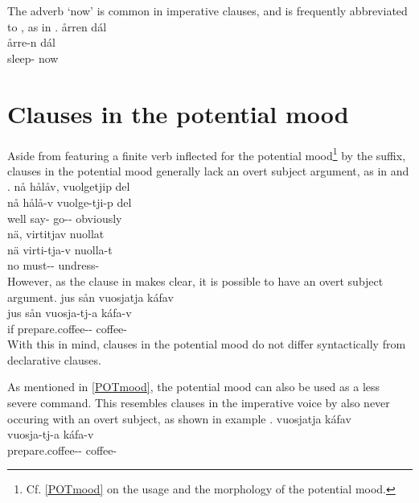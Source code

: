 The adverb  ‘now’ is common in imperative clauses, and is frequently abbreviated to , as in .
\ea\label{impClause5}
\glll	årren dál\\
	årre-n dál\\
	sleep- now\\\nopagebreak
{} 
\z


\section{Clauses in the potential mood}\label{potClauses}
Aside from featuring a finite verb inflected for the potential mood\footnote{Cf. \SEC\ref{POTmood} on the usage and the morphology of the potential mood.} by the  suffix, clauses in the potential mood generally lack an overt subject argument, as in %
 and . 
\ea\label{potSyntaxEx2}
\glll	nå hålåv, vuolgetjip del\\
	nå hålå-v vuolge-tji-p del\\
	well say- go-- obviously\\\nopagebreak
{}	
\z
\ea\label{potSyntaxEx3}
\glll	nä, virtitjav nuollat\\
	nä virti-tja-v nuolla-t\\
	no must-- undress-\\\nopagebreak
{}	
\z
However, as the clause in  makes clear, it is possible to have an overt subject argument. 
\ea\label{potSyntaxEx1}
\glll	jus sån vuosjatja káfav\\
	jus sån vuosja-tj-a káfa-v\\
	if  prepare.coffee-- coffee-\\\nopagebreak
{}	
\z
With this in mind, clauses in the potential mood do not differ syntactically from declarative clauses. %

As mentioned in \SEC\ref{POTmood}, the potential mood can also be used as a less severe command. This resembles clauses in the imperative voice by also never occuring with an overt subject, as shown %
in example . 
\ea\label{potSyntaxEx4}%
\glll	vuosjatja káfav\\
	vuosja-tj-a káfa-v\\
	prepare.coffee-- coffee-\\\nopagebreak
{}	
\z

